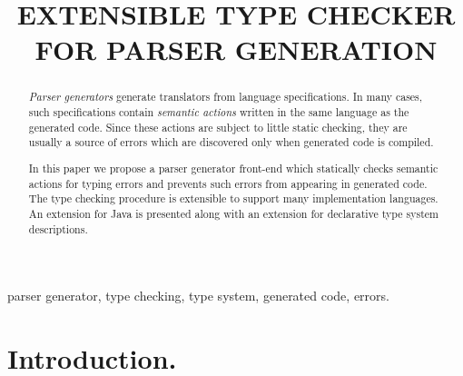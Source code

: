 \documentclass{informat} %
\begin{document}
%
\volume{}
\issue{}
\pubyear{}
\firstpage{}
\lastpage{}
\articletype{}   %
%
%
\begin{frontmatter}                           %
%
\title{EXTENSIBLE TYPE CHECKER\\ FOR PARSER GENERATION}
%
\author{ }
\address{Mathematics Department at Natural Science Faculty,\\
St. Petersburg State University of Information Technology, Mechanics and Optics\\
Kronverskiy~49, 195009, St.Petersburg, Russia\\
}
%
\begin{abstract}
	\emph{Parser generators} generate translators from language specifications. In many cases, such specifications contain \emph{semantic actions} written in the same language as the generated code. Since these actions are subject to little static checking, they are usually a source of errors which are discovered only when generated code is compiled.

	In this paper we propose a parser generator front-end which statically checks semantic actions for typing errors and prevents such errors from appearing in generated code. The type checking procedure is extensible to support many implementation languages. An extension for Java is presented along with an extension for declarative type system descriptions.
\end{abstract}
\begin{keyword}
parser generator, type checking, type system, generated code, errors.
\end{keyword}
\end{frontmatter}


\maketitle

\section{Introduction.}\label{Introduction}
\end{document}
